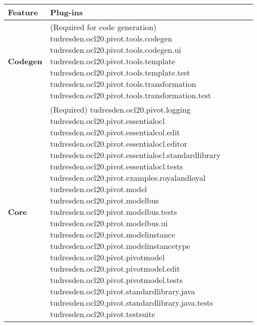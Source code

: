 \begin{table}[p]
\begin{tabular}{|p{4cm}|p{10cm}|}
    \hline
    \textbf{Feature} & \textbf{Plug-ins} \\
    \hline

    \textbf{Codegen} &
    (Required for code generation)\newline
    tudresden.ocl20.pivot.tools.codegen\newline
    tudresden.ocl20.pivot.tools.codegen.ui\newline
    tudresden.ocl20.pivot.tools.template\newline
    tudresden.ocl20.pivot.tools.template.test\newline
    tudresden.ocl20.pivot.tools.transformation\newline
    tudresden.ocl20.pivot.tools.transformation.test\\
    \hline

    \textbf{Core} & 
    (Required)\newline
    tudresden.ocl20.pivot.logging\newline
    tudresden.ocl20.pivot.essentialocl\newline
    tudresden.ocl20.pivot.essentialcol.edit\newline
    tudresden.ocl20.pivot.essentialocl.editor\newline
    tudresden.ocl20.pivot.essentialocl.standardlibrary\newline
    tudresden.ocl20.pivot.essentialocl.tests\newline
    tudresden.ocl20.pivot.examples.royalandloyal\newline
    tudresden.ocl20.pivot.model\newline
    tudresden.ocl20.pivot.modelbus\newline
    tudresden.ocl20.pivot.modelbus.tests\newline
    tudresden.ocl20.pivot.modelbus.ui\newline
    tudresden.ocl20.pivot.modelinstance\newline
    tudresden.ocl20.pivot.modelinstancetype\newline
    tudresden.ocl20.pivot.pivotmodel\newline
    tudresden.ocl20.pivot.pivotmodel.edit\newline
    tudresden.ocl20.pivot.pivotmodel.tests\newline
    tudresden.ocl20.pivot.standardlibrary.java\newline
    tudresden.ocl20.pivot.standardlibrary.java.tests\newline
    tudresden.ocl20.pivot.testsuite\\
    \hline


\end{tabular}
\end{table}
